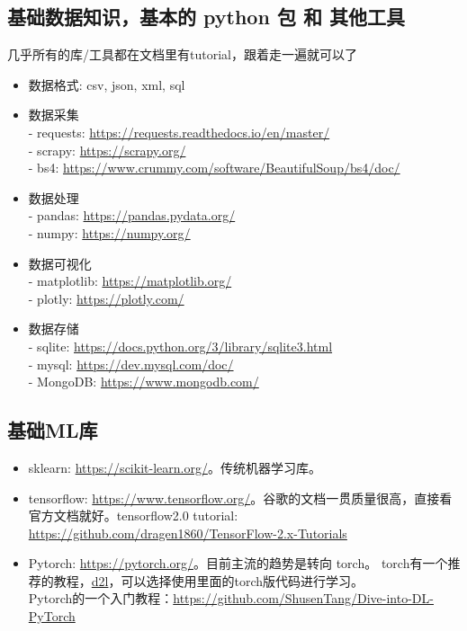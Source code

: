 \documentclass[lang=cn,11pt,a4paper]{eleganttemplate}
\begin{document}
\subsection{基础数据知识，基本的 python 包 和 其他工具}
几乎所有的库/工具都在文档里有tutorial，跟着走一遍就可以了
\begin{itemize}
    \item 数据格式: csv, json, xml, sql
    \item 数据采集\\
    - requests: \href{https://requests.readthedocs.io/en/master/}{https://requests.readthedocs.io/en/master/} \\
    - scrapy:  \href{https://scrapy.org/}{https://scrapy.org/} \\
    - bs4: \href{https://www.crummy.com/software/BeautifulSoup/bs4/doc/}{https://www.crummy.com/software/BeautifulSoup/bs4/doc/} 
    \item 数据处理 \\
    - pandas: \href{https://pandas.pydata.org/}{https://pandas.pydata.org/} \\
    - numpy:  \href{https://numpy.org/}{https://numpy.org/}
    \item 数据可视化\\
    - matplotlib: \href{https://matplotlib.org/}{https://matplotlib.org/} \\
    - plotly: \href{https://plotly.com/}{https://plotly.com/}
    \item 数据存储 \\
    - sqlite: \href{https://docs.python.org/3/library/sqlite3.html}{https://docs.python.org/3/library/sqlite3.html} \\
    - mysql: \href{https://dev.mysql.com/doc/}{https://dev.mysql.com/doc/} \\
    - MongoDB: \href{https://www.mongodb.com/}{https://www.mongodb.com/}
\end{itemize}
 
\subsection{基础ML库}
\begin{itemize}
    \item sklearn: \href{https://scikit-learn.org/}{https://scikit-learn.org/}。传统机器学习库。
    \item tensorflow: \href{https://www.tensorflow.org/}{https://www.tensorflow.org/}。谷歌的文档一贯质量很高，直接看官方文档就好。tensorflow2.0 tutorial: \href{https://github.com/dragen1860/TensorFlow-2.x-Tutorials}{https://github.com/dragen1860/TensorFlow-2.x-Tutorials}
    \item Pytorch: \href{https://pytorch.org/}{https://pytorch.org/}。目前主流的趋势是转向 torch。 torch有一个推荐的教程，\href{https://d2l.ai/}{d2l}，可以选择使用里面的torch版代码进行学习。\\
    Pytorch的一个入门教程：\href{https://github.com/ShusenTang/Dive-into-DL-PyTorch}{https://github.com/ShusenTang/Dive-into-DL-PyTorch}
\end{itemize}
\end{document}
